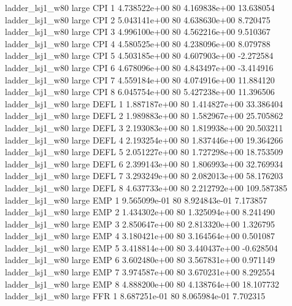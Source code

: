     ladder_lsj1_w80      large      CPI                 1 4.738522e+00 80   4.169838e+00          13.638054
    ladder_lsj1_w80      large      CPI                 2 5.043141e+00 80   4.638630e+00           8.720475
    ladder_lsj1_w80      large      CPI                 3 4.996100e+00 80   4.562216e+00           9.510367
    ladder_lsj1_w80      large      CPI                 4 4.580525e+00 80   4.238096e+00           8.079788
    ladder_lsj1_w80      large      CPI                 5 4.503185e+00 80   4.607903e+00          -2.272584
    ladder_lsj1_w80      large      CPI                 6 4.678096e+00 80   4.843497e+00          -3.414916
    ladder_lsj1_w80      large      CPI                 7 4.559184e+00 80   4.074916e+00          11.884120
    ladder_lsj1_w80      large      CPI                 8 6.045754e+00 80   5.427238e+00          11.396506
    ladder_lsj1_w80      large     DEFL                 1 1.887187e+00 80   1.414827e+00          33.386404
    ladder_lsj1_w80      large     DEFL                 2 1.989883e+00 80   1.582967e+00          25.705862
    ladder_lsj1_w80      large     DEFL                 3 2.193083e+00 80   1.819938e+00          20.503211
    ladder_lsj1_w80      large     DEFL                 4 2.193254e+00 80   1.837446e+00          19.364266
    ladder_lsj1_w80      large     DEFL                 5 2.051227e+00 80   1.727298e+00          18.753509
    ladder_lsj1_w80      large     DEFL                 6 2.399143e+00 80   1.806993e+00          32.769934
    ladder_lsj1_w80      large     DEFL                 7 3.293249e+00 80   2.082013e+00          58.176203
    ladder_lsj1_w80      large     DEFL                 8 4.637733e+00 80   2.212792e+00         109.587385
    ladder_lsj1_w80      large      EMP                 1 9.565099e-01 80   8.924843e-01           7.173857
    ladder_lsj1_w80      large      EMP                 2 1.434302e+00 80   1.325094e+00           8.241490
    ladder_lsj1_w80      large      EMP                 3 2.850647e+00 80   2.813320e+00           1.326795
    ladder_lsj1_w80      large      EMP                 4 3.180421e+00 80   3.164564e+00           0.501087
    ladder_lsj1_w80      large      EMP                 5 3.418814e+00 80   3.440437e+00          -0.628504
    ladder_lsj1_w80      large      EMP                 6 3.602480e+00 80   3.567831e+00           0.971149
    ladder_lsj1_w80      large      EMP                 7 3.974587e+00 80   3.670231e+00           8.292554
    ladder_lsj1_w80      large      EMP                 8 4.888200e+00 80   4.138764e+00          18.107732
    ladder_lsj1_w80      large      FFR                 1 8.687251e-01 80   8.065984e-01           7.702315
